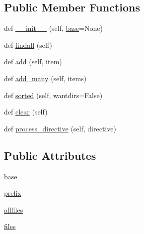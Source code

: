 \subsection*{Public Member Functions}
\begin{DoxyCompactItemize}
\item 
def \hyperlink{classpip_1_1__vendor_1_1distlib_1_1manifest_1_1Manifest_aa7818aa8315043198ae81888a18bc5e9}{\+\_\+\+\_\+init\+\_\+\+\_\+} (self, \hyperlink{classpip_1_1__vendor_1_1distlib_1_1manifest_1_1Manifest_a43fff3e16d28486e91714013e90019a0}{base}=None)
\item 
def \hyperlink{classpip_1_1__vendor_1_1distlib_1_1manifest_1_1Manifest_addcd8fc4c92d2b4d110a3c0d50222763}{findall} (self)
\item 
def \hyperlink{classpip_1_1__vendor_1_1distlib_1_1manifest_1_1Manifest_adb54bd095e16a9e59e0e674bd4808dad}{add} (self, item)
\item 
def \hyperlink{classpip_1_1__vendor_1_1distlib_1_1manifest_1_1Manifest_aa18ac58e0425c6d4de8ac182a52145fe}{add\+\_\+many} (self, items)
\item 
def \hyperlink{classpip_1_1__vendor_1_1distlib_1_1manifest_1_1Manifest_af1fc24c226436c0534cad89e1faa3fa2}{sorted} (self, wantdirs=False)
\item 
def \hyperlink{classpip_1_1__vendor_1_1distlib_1_1manifest_1_1Manifest_ac5d289057626a72d1d8c6322b766df56}{clear} (self)
\item 
def \hyperlink{classpip_1_1__vendor_1_1distlib_1_1manifest_1_1Manifest_a2fa40995f2b5077d7aacd933325eba9f}{process\+\_\+directive} (self, directive)
\end{DoxyCompactItemize}
\subsection*{Public Attributes}
\begin{DoxyCompactItemize}
\item 
\hyperlink{classpip_1_1__vendor_1_1distlib_1_1manifest_1_1Manifest_a43fff3e16d28486e91714013e90019a0}{base}
\item 
\hyperlink{classpip_1_1__vendor_1_1distlib_1_1manifest_1_1Manifest_a82926f98537d20efa20ee0bce22871b4}{prefix}
\item 
\hyperlink{classpip_1_1__vendor_1_1distlib_1_1manifest_1_1Manifest_a8749228dc0f36749217a77e12828c329}{allfiles}
\item 
\hyperlink{classpip_1_1__vendor_1_1distlib_1_1manifest_1_1Manifest_acea04fe9e5d68a4d49fcb9294ae029c5}{files}
\end{DoxyCompactItemize}


